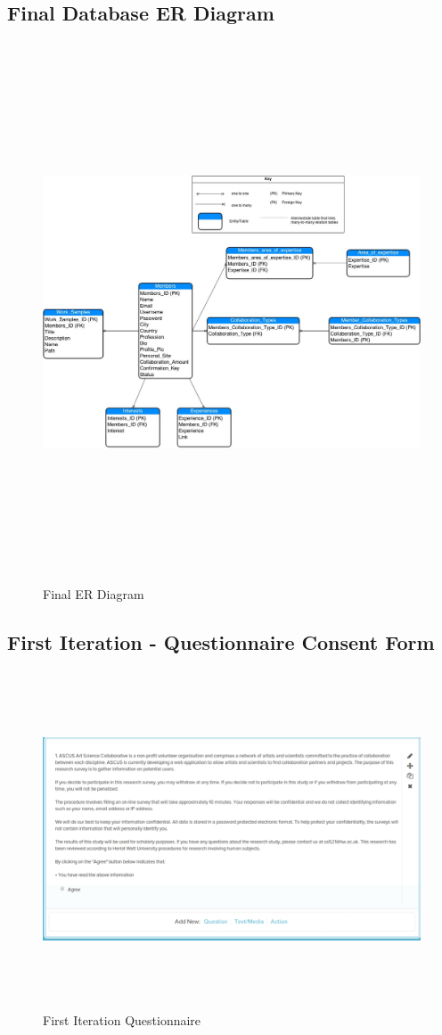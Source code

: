 \documentclass[a4paper,oneside,11pt]{report}
\begin{document}
\begin{appendices}
\section{Final Database ER Diagram}
\begin{figure}[!ht]
\centering
\includegraphics[width=18cm,height=16cm]{appendix/final-ER-Diagram.jpg}
\caption{Final ER Diagram}
\end{figure}
\pagebreak

\subsection{First Iteration - Questionnaire Consent Form}
\begin{figure}[!ht]
\centering
\includegraphics[width=16cm,height=10cm]{appendix/first-iteration-questionnaire-consent-form.png}
\caption{First Iteration Questionnaire}
\end{figure}


\end{appendices}
\end{document}
